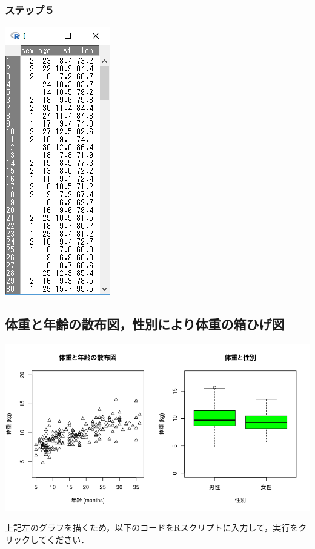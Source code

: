 \documentclass[11pt,]{problemset}
\newenvironment{Shaded}{\begin{snugshade}}{\end{snugshade}}
\newcommand{\DataTypeTok}[1]{\textcolor[rgb]{0.13,0.29,0.53}{#1}}
\newcommand{\DecValTok}[1]{\textcolor[rgb]{0.00,0.00,0.81}{#1}}
\newcommand{\KeywordTok}[1]{\textcolor[rgb]{0.13,0.29,0.53}{\textbf{#1}}}
\newcommand{\NormalTok}[1]{#1}
\newcommand{\OperatorTok}[1]{\textcolor[rgb]{0.81,0.36,0.00}{\textbf{#1}}}
\newcommand{\StringTok}[1]{\textcolor[rgb]{0.31,0.60,0.02}{#1}}
\begin{document}
\hypertarget{section-10}{%
\subsubsection{ステップ５}\label{section-10}}

\begin{center}\includegraphics[width=0.15\linewidth]{pic/import05} \end{center}

\hypertarget{section-11}{%
\subsection{体重と年齢の散布図，性別により体重の箱ひげ図}\label{section-11}}

\begin{center}\includegraphics[width=0.85\linewidth]{pic/scatter00} \end{center}

上記左のグラフを描くため，以下のコードをRスクリプトに入力して，実行をクリックしてください．

\begin{Shaded}
\end{Shaded}
\end{document}
